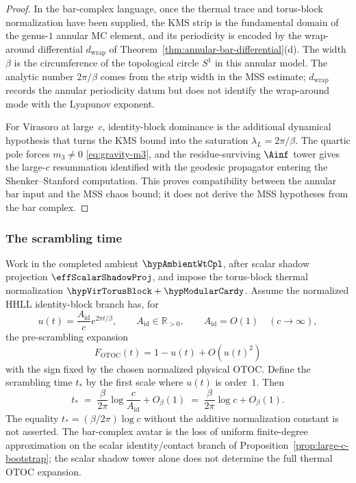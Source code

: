 \begin{proof}
In the bar-complex language, once the thermal trace and torus-block
normalization have been supplied, the KMS strip is the fundamental
domain of the genus-$1$ annular MC element, and its periodicity is
encoded by the wrap-around differential \(d_{\mathrm{wrap}}\) of
Theorem~\ref{thm:annular-bar-differential}(d).  The width \(\beta\)
is the circumference of the topological circle \(S^1\) in this annular
model.  The analytic number \(2\pi/\beta\) comes from the strip width
in the MSS estimate; \(d_{\mathrm{wrap}}\) records the annular
periodicity datum but does not identify the wrap-around mode with the
Lyapunov exponent.

For Virasoro at large~$c$, identity-block dominance is the
additional dynamical hypothesis that turns the KMS bound into the
saturation $\lambda_L = 2\pi/\beta$.  The quartic pole forces
$m_3 \ne 0$ \eqref{eq:gravity-m3}, and the residue-surviving
$\Ainf$ tower gives the large-$c$ resummation identified with the
geodesic propagator entering the Shenker--Stanford computation.  This
proves compatibility between the annular bar input and the MSS chaos
bound; it does not derive the MSS hypotheses from the bar complex.
\end{proof}

\subsubsection*{The scrambling time}

\begin{proposition}
\label{prop:scrambling-time}%
%
Work in the completed ambient \(\hypAmbientWtCpl\), after scalar
shadow projection \(\effScalarShadowProj\), and impose the torus-block
thermal normalization \(\hypVirTorusBlock+\hypModularCardy\).  Assume
the normalized HHLL identity-block branch has, for
\[
u(t)=\frac{A_{\mathrm{id}}}{c}e^{2\pi t/\beta},\qquad
A_{\mathrm{id}}\in\mathbb R_{>0},\qquad A_{\mathrm{id}}=O(1)
\quad(c\to\infty),
\]
the pre-scrambling expansion
\[
F_{\mathrm{OTOC}}(t)=1-u(t)+O(u(t)^2)
\]
with the sign fixed by the chosen normalized physical OTOC.  Define
the scrambling time \(t_*\) by the first scale where \(u(t)\) is
order~\(1\).  Then
\begin{equation}\label{eq:scrambling-time}
\boxed{
t_*
\;=\;
\frac{\beta}{2\pi}\log\frac{c}{A_{\mathrm{id}}}+O_\beta(1)
\;=\;
\frac{\beta}{2\pi}\log c+O_\beta(1).
}
\end{equation}
The equality \(t_*=(\beta/2\pi)\log c\) without the additive
normalization constant is not asserted.  The bar-complex avatar is the
loss of uniform finite-degree approximation on the scalar
identity/contact branch of Proposition~\ref{prop:large-c-bootstrap};
the scalar shadow tower alone does not determine the full thermal OTOC
expansion.
\end{proposition}

